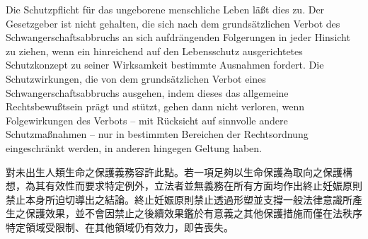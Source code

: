\documentclass[12pt]{article}
\begin{document}
\begin{sourcepara}[title={原文D.104}]
Die Schutzpflicht für das ungeborene menschliche Leben läßt dies zu. Der Gesetzgeber ist nicht gehalten, die sich nach dem grundsätzlichen Verbot des Schwangerschaftsabbruchs an sich aufdrängenden Folgerungen in jeder Hinsicht zu ziehen, wenn ein hinreichend auf den Lebensschutz ausgerichtetes Schutzkonzept zu seiner Wirksamkeit bestimmte Ausnahmen fordert. Die Schutzwirkungen, die von dem grundsätzlichen Verbot eines Schwangerschaftsabbruchs ausgehen, indem dieses das allgemeine Rechtsbewußtsein prägt und stützt, gehen dann nicht verloren, wenn Folgewirkungen des Verbots -- mit Rücksicht auf sinnvolle andere Schutzmaßnahmen -- nur in bestimmten Bereichen der Rechtsordnung eingeschränkt werden, in anderen hingegen Geltung haben.
\end{sourcepara}
\begin{transpara}
對未出生人類生命之保護義務容許此點。若一項足夠以生命保護為取向之保護構想，為其有效性而要求特定例外，立法者並無義務在所有方面均作出終止妊娠原則禁止本身所迫切導出之結論。終止妊娠原則禁止透過形塑並支撐一般法律意識所產生之保護效果，並不會因禁止之後續效果鑑於有意義之其他保護措施而僅在法秩序特定領域受限制、在其他領域仍有效力，即告喪失。
\end{transpara}
\end{document}
